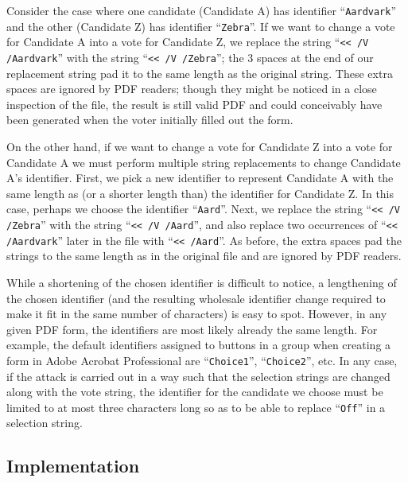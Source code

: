 \documentclass{article}
\newcommand{\etc}{etc.\xspace}
\begin{document}
Consider the case where one candidate (Candidate A) has identifier
``\texttt{Aardvark}'' and the other (Candidate Z) has identifier
``\texttt{Zebra}''. If we want to change a vote for Candidate A into a
vote for Candidate Z, we replace the string ``\texttt{<{}< /V
  /Aardvark}'' with the string ``\texttt{<{}< /V
  /Zebra\textvisiblespace\textvisiblespace\textvisiblespace}''; the 3
spaces at the end of our replacement string pad it to the same length
as the original string. These extra spaces are ignored by PDF readers;
though they might be noticed in a close inspection of the file, the
result is still valid PDF and could conceivably have been generated
when the voter initially filled out the form.

On the other hand, if we want to change a vote for Candidate Z into a
vote for Candidate A we must perform multiple string replacements to
change Candidate A's identifier.  First, we pick a new identifier to
represent Candidate A with the same length as (or a shorter length
than) the identifier for Candidate Z. In this case, perhaps we choose
the identifier ``\texttt{Aard}''. Next, we replace the string
``\texttt{<{}< /V /Zebra}'' with the string ``\texttt{<{}< /V
  /Aard\textvisiblespace}'', and also replace two occurrences of
``\texttt{<{}< /Aardvark}'' later in the file with ``\texttt{<{}<
  /Aard\textvisiblespace\textvisiblespace\textvisiblespace\textvisiblespace}''. As
before, the extra spaces pad the strings to the same length as in the
original file and are ignored by PDF readers.

While a shortening of the chosen identifier is difficult to notice, a
lengthening of the chosen identifier (and the resulting wholesale
identifier change required to make it fit in the same number of
characters) is easy to spot. However, in any given PDF form, the
identifiers are most likely already the same length. For example, the
default identifiers assigned to buttons in a group when creating a
form in Adobe Acrobat Professional are ``\texttt{Choice1}'',
``\texttt{Choice2}'', \etc In any case, if the attack is carried out
in a way such that the selection strings are changed along with the
vote string, the identifier for the candidate we choose must be
limited to at most three characters long so as to be able to replace
``\texttt{Off}'' in a selection string.


\subsection{Implementation}
\end{document}
